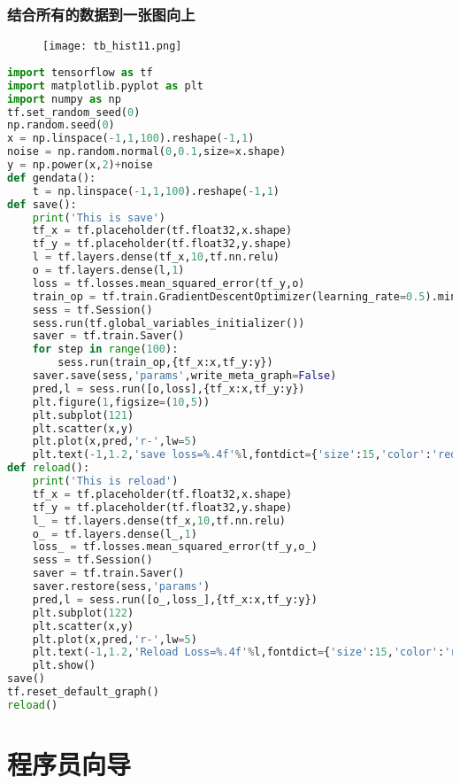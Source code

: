 \subsection{结合所有的数据到一张图向上}
\begin{center}
\begin{figure}[H]
\texttt{[image: tb\_hist11.png]}
\end{figure}
\end{center}


\begin{lstlisting}[language=Python]
import tensorflow as tf
import matplotlib.pyplot as plt
import numpy as np
tf.set_random_seed(0)
np.random.seed(0)
x = np.linspace(-1,1,100).reshape(-1,1)
noise = np.random.normal(0,0.1,size=x.shape)
y = np.power(x,2)+noise
def gendata():
    t = np.linspace(-1,1,100).reshape(-1,1)
def save():
    print('This is save')
    tf_x = tf.placeholder(tf.float32,x.shape)
    tf_y = tf.placeholder(tf.float32,y.shape)
    l = tf.layers.dense(tf_x,10,tf.nn.relu)
    o = tf.layers.dense(l,1)
    loss = tf.losses.mean_squared_error(tf_y,o)
    train_op = tf.train.GradientDescentOptimizer(learning_rate=0.5).minimize(loss)
    sess = tf.Session()
    sess.run(tf.global_variables_initializer())
    saver = tf.train.Saver()
    for step in range(100):
        sess.run(train_op,{tf_x:x,tf_y:y})
    saver.save(sess,'params',write_meta_graph=False)
    pred,l = sess.run([o,loss],{tf_x:x,tf_y:y})
    plt.figure(1,figsize=(10,5))
    plt.subplot(121)
    plt.scatter(x,y)
    plt.plot(x,pred,'r-',lw=5)
    plt.text(-1,1.2,'save loss=%.4f'%l,fontdict={'size':15,'color':'red'})
def reload():
    print('This is reload')
    tf_x = tf.placeholder(tf.float32,x.shape)
    tf_y = tf.placeholder(tf.float32,y.shape)
    l_ = tf.layers.dense(tf_x,10,tf.nn.relu)
    o_ = tf.layers.dense(l_,1)
    loss_ = tf.losses.mean_squared_error(tf_y,o_)
    sess = tf.Session()
    saver = tf.train.Saver()
    saver.restore(sess,'params')
    pred,l = sess.run([o_,loss_],{tf_x:x,tf_y:y})
    plt.subplot(122)
    plt.scatter(x,y)
    plt.plot(x,pred,'r-',lw=5)
    plt.text(-1,1.2,'Reload Loss=%.4f'%l,fontdict={'size':15,'color':'red'})
    plt.show()
save()
tf.reset_default_graph()
reload()
\end{lstlisting}

\chapter{程序员向导}
